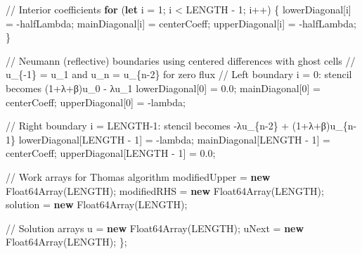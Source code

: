 \documentclass[
  letterpaper,
  DIV=11,
  numbers=noendperiod]{scrreprt}
\newenvironment{Shaded}{\begin{snugshade}}{\end{snugshade}}
\newcommand{\BuiltInTok}[1]{\textcolor[rgb]{0.00,0.23,0.31}{#1}}
\newcommand{\CommentTok}[1]{\textcolor[rgb]{0.37,0.37,0.37}{#1}}
\newcommand{\ControlFlowTok}[1]{\textcolor[rgb]{0.00,0.23,0.31}{\textbf{#1}}}
\newcommand{\DecValTok}[1]{\textcolor[rgb]{0.68,0.00,0.00}{#1}}
\newcommand{\FloatTok}[1]{\textcolor[rgb]{0.68,0.00,0.00}{#1}}
\newcommand{\KeywordTok}[1]{\textcolor[rgb]{0.00,0.23,0.31}{\textbf{#1}}}
\newcommand{\NormalTok}[1]{\textcolor[rgb]{0.00,0.23,0.31}{#1}}
\newcommand{\OperatorTok}[1]{\textcolor[rgb]{0.37,0.37,0.37}{#1}}
\begin{document}
\begin{Shaded}
\begin{Highlighting}[]
    \CommentTok{// Interior coefficients}
    \ControlFlowTok{for}\NormalTok{ (}\KeywordTok{let}\NormalTok{ i }\OperatorTok{=} \DecValTok{1}\OperatorTok{;}\NormalTok{ i }\OperatorTok{\textless{}}\NormalTok{ LENGTH }\OperatorTok{{-}} \DecValTok{1}\OperatorTok{;}\NormalTok{ i}\OperatorTok{++}\NormalTok{) \{}
\NormalTok{        lowerDiagonal[i] }\OperatorTok{=} \OperatorTok{{-}}\NormalTok{halfLambda}\OperatorTok{;}
\NormalTok{        mainDiagonal[i] }\OperatorTok{=}\NormalTok{ centerCoeff}\OperatorTok{;}
\NormalTok{        upperDiagonal[i] }\OperatorTok{=} \OperatorTok{{-}}\NormalTok{halfLambda}\OperatorTok{;}
\NormalTok{    \}}

    \CommentTok{// Neumann (reflective) boundaries using centered differences with ghost cells}
    \CommentTok{// u\_\{{-}1\} = u\_1 and u\_n = u\_\{n{-}2\} for zero flux}
    \CommentTok{// Left boundary i = 0: stencil becomes (1+λ+β)u\_0 {-} λu\_1}
\NormalTok{    lowerDiagonal[}\DecValTok{0}\NormalTok{] }\OperatorTok{=} \FloatTok{0.0}\OperatorTok{;}
\NormalTok{    mainDiagonal[}\DecValTok{0}\NormalTok{] }\OperatorTok{=}\NormalTok{ centerCoeff}\OperatorTok{;}
\NormalTok{    upperDiagonal[}\DecValTok{0}\NormalTok{] }\OperatorTok{=} \OperatorTok{{-}}\NormalTok{lambda}\OperatorTok{;}

    \CommentTok{// Right boundary i = LENGTH{-}1: stencil becomes {-}λu\_\{n{-}2\} + (1+λ+β)u\_\{n{-}1\}}
\NormalTok{    lowerDiagonal[LENGTH }\OperatorTok{{-}} \DecValTok{1}\NormalTok{] }\OperatorTok{=} \OperatorTok{{-}}\NormalTok{lambda}\OperatorTok{;}
\NormalTok{    mainDiagonal[LENGTH }\OperatorTok{{-}} \DecValTok{1}\NormalTok{] }\OperatorTok{=}\NormalTok{ centerCoeff}\OperatorTok{;}
\NormalTok{    upperDiagonal[LENGTH }\OperatorTok{{-}} \DecValTok{1}\NormalTok{] }\OperatorTok{=} \FloatTok{0.0}\OperatorTok{;}

    \CommentTok{// Work arrays for Thomas algorithm}
\NormalTok{    modifiedUpper }\OperatorTok{=} \KeywordTok{new} \BuiltInTok{Float64Array}\NormalTok{(LENGTH)}\OperatorTok{;}
\NormalTok{    modifiedRHS }\OperatorTok{=} \KeywordTok{new} \BuiltInTok{Float64Array}\NormalTok{(LENGTH)}\OperatorTok{;}
\NormalTok{    solution }\OperatorTok{=} \KeywordTok{new} \BuiltInTok{Float64Array}\NormalTok{(LENGTH)}\OperatorTok{;}

    \CommentTok{// Solution arrays}
\NormalTok{    u }\OperatorTok{=} \KeywordTok{new} \BuiltInTok{Float64Array}\NormalTok{(LENGTH)}\OperatorTok{;}
\NormalTok{    uNext }\OperatorTok{=} \KeywordTok{new} \BuiltInTok{Float64Array}\NormalTok{(LENGTH)}\OperatorTok{;}
\NormalTok{\}}\OperatorTok{;}
\end{Highlighting}
\end{Shaded}
\end{document}
